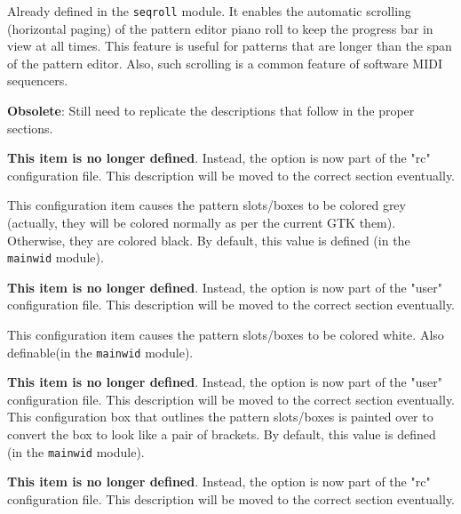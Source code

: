         Already defined in the \texttt{seqroll} module.
        It enables the automatic scrolling (horizontal paging) of the pattern
        editor piano roll to keep the progress bar in view at all times.
        This feature is useful for patterns that are longer than the span of
        the pattern editor.  Also, such scrolling is a common feature of
        software MIDI sequencers.

   \textbf{Obsolete}:  Still need to replicate the descriptions that follow
      in the proper sections.

        \textbf{This item is no longer defined}.
        Instead, the option is now part of the "rc" configuration file.  This
        description will be moved to the correct section eventually.

        This configuration item causes the pattern slots/boxes to be colored
        grey (actually, they will be colored normally as per the current GTK
        them).  Otherwise, they are colored black.  By default, this value is
        defined (in the \texttt{mainwid} module).

        \textbf{This item is no longer defined}.
        Instead, the option is now part of the "user" configuration file.  This
        description will be moved to the correct section eventually.

        This configuration item causes the pattern slots/boxes to be colored
        white.  Also definable(in the \texttt{mainwid} module).

        \textbf{This item is no longer defined}.
        Instead, the option is now part of the "user" configuration file.  This
        description will be moved to the correct section eventually.
        This configuration box that outlines the pattern slots/boxes is
        painted over to convert the box to look like a pair of brackets.
        By default, this value is defined (in the \texttt{mainwid} module).

        \textbf{This item is no longer defined}.
        Instead, the option is now part of the "rc" configuration file.  This
        description will be moved to the correct section eventually.

